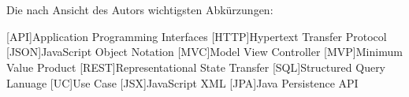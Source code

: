 \chapter*{\nameoflistofacronyms}

Die nach Ansicht des Autors wichtigsten Abkürzungen:
\bigskip

\begin{adjustwidth}{1.5em}{}
\begin{acronym}[AAAAA] %
	
	
	
	[API]{Application Programming Interfaces}
	[HTTP]{Hypertext Transfer Protocol}
	[JSON]{JavaScript Object Notation}
	[MVC]{Model View Controller}
	[MVP]{Minimum Value Product}
	[REST]{Representational State Transfer}
	[SQL]{Structured Query Lanuage}
	[UC]{Use Case}
	[JSX]{JavaScript XML}
	[JPA]{Java Persistence API}

	
	
	
\end{acronym}	
\end{adjustwidth}
